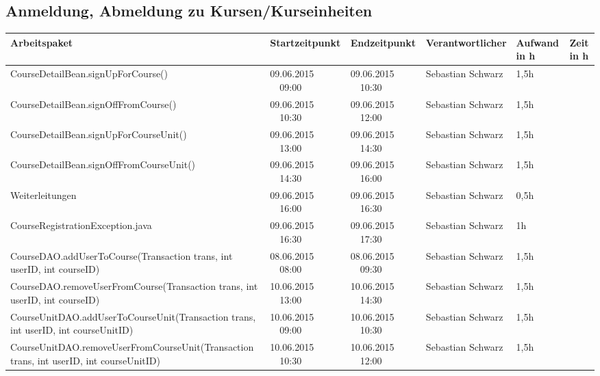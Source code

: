 \begin{landscape}
	\subsection{Anmeldung, Abmeldung zu Kursen/Kurseinheiten}
    \begin{tabular}{|p{10.3cm}|p{3.2cm}|p{3.2cm}|p{3.5cm}|p{1.7cm}|p{1.5cm}|}
	\hline  \textbf{Arbeitspaket} & \textbf{Startzeitpunkt} & \textbf{Endzeitpunkt} & \textbf{Verantwortlicher}  & \textbf{Aufwand in h} & \textbf{Zeit in h}\\
		\hline   CourseDetailBean.signUpForCourse()                          & 09.06.2015 \ \ 09:00       & 09.06.2015 \ \ 10:30        & Sebastian Schwarz & 1,5h                 &\\
		\hline   CourseDetailBean.signOffFromCourse()                        & 09.06.2015 \ \ 10:30       & 09.06.2015 \ \ 12:00        & Sebastian Schwarz & 1,5h                 &\\
		\hline   CourseDetailBean.signUpForCourseUnit()                      & 09.06.2015 \ \ 13:00       & 09.06.2015 \ \ 14:30        & Sebastian Schwarz & 1,5h                 &\\
		\hline   CourseDetailBean.signOffFromCourseUnit()                    & 09.06.2015 \ \ 14:30       & 09.06.2015 \ \ 16:00        & Sebastian Schwarz & 1,5h                 & \\
		\hline   Weiterleitungen                                             & 09.06.2015 \ \ 16:00       & 09.06.2015 \ \ 16:30        & Sebastian Schwarz & 0,5h                 &\\
		\hline   CourseRegistrationException.java                            & 09.06.2015 \ \ 16:30       & 09.06.2015 \ \ 17:30        & Sebastian Schwarz & 1h                 &\\
		\hline   CourseDAO.addUserToCourse(Transaction trans, int userID, int courseID)            & 08.06.2015 \ \ 08:00       & 08.06.2015 \ \ 09:30      & Sebastian Schwarz  & 1,5h                 &\\
		\hline   CourseDAO.removeUserFromCourse(Transaction trans, int userID, int courseID)       & 10.06.2015 \ \ 13:00       & 10.06.2015 \ \ 14:30      & Sebastian Schwarz  & 1,5h                 &\\
		\hline   CourseUnitDAO.addUserToCourseUnit(Transaction trans, int userID, int courseUnitID)& 10.06.2015 \ \ 09:00       & 10.06.2015 \ \ 10:30      & Sebastian Schwarz  & 1,5h                 & \\
		\hline   CourseUnitDAO.removeUserFromCourseUnit(Transaction trans, int userID, int courseUnitID) & 10.06.2015 \ \ 10:30       & 10.06.2015 \ \ 12:00  & Sebastian Schwarz & 1,5h                 &\\

\end{tabular}
\end{landscape}
